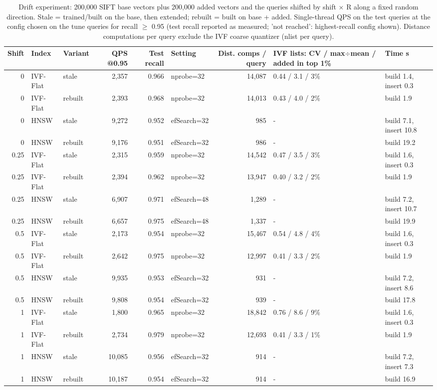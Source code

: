 \begin{table}[t]
\centering
\small
\begin{adjustbox}{max width=\linewidth}
\begin{tabular}{rllrrlrp{2.8cm}p{2.4cm}}
\toprule
Shift & Index & Variant & QPS @0.95 & Test recall & Setting & Dist. comps / query & IVF lists: CV / max$\div$mean / added in top 1\% & Time s \\
\midrule
0 & IVF-Flat & stale & 2,357 & 0.966 & nprobe=32 & 14,087 & 0.44 / 3.1 / 3\% & build 1.4, insert 0.3 \\
0 & IVF-Flat & rebuilt & 2,393 & 0.968 & nprobe=32 & 14,013 & 0.43 / 4.0 / 2\% & build 1.9 \\
0 & HNSW & stale & 9,272 & 0.952 & efSearch=32 & 985 & - & build 7.1, insert 10.8 \\
0 & HNSW & rebuilt & 9,176 & 0.951 & efSearch=32 & 986 & - & build 19.2 \\
0.25 & IVF-Flat & stale & 2,315 & 0.959 & nprobe=32 & 14,542 & 0.47 / 3.5 / 3\% & build 1.6, insert 0.3 \\
0.25 & IVF-Flat & rebuilt & 2,394 & 0.962 & nprobe=32 & 13,947 & 0.40 / 3.2 / 2\% & build 1.9 \\
0.25 & HNSW & stale & 6,907 & 0.971 & efSearch=48 & 1,289 & - & build 7.2, insert 10.7 \\
0.25 & HNSW & rebuilt & 6,657 & 0.975 & efSearch=48 & 1,337 & - & build 19.9 \\
0.5 & IVF-Flat & stale & 2,173 & 0.954 & nprobe=32 & 15,467 & 0.54 / 4.8 / 4\% & build 1.6, insert 0.3 \\
0.5 & IVF-Flat & rebuilt & 2,642 & 0.975 & nprobe=32 & 12,997 & 0.41 / 3.3 / 2\% & build 1.9 \\
0.5 & HNSW & stale & 9,935 & 0.953 & efSearch=32 & 931 & - & build 7.2, insert 8.6 \\
0.5 & HNSW & rebuilt & 9,808 & 0.954 & efSearch=32 & 939 & - & build 17.8 \\
1 & IVF-Flat & stale & 1,800 & 0.965 & nprobe=32 & 18,842 & 0.76 / 8.6 / 9\% & build 1.6, insert 0.3 \\
1 & IVF-Flat & rebuilt & 2,734 & 0.979 & nprobe=32 & 12,693 & 0.41 / 3.3 / 1\% & build 1.9 \\
1 & HNSW & stale & 10,085 & 0.956 & efSearch=32 & 914 & - & build 7.2, insert 7.3 \\
1 & HNSW & rebuilt & 10,187 & 0.954 & efSearch=32 & 914 & - & build 16.9 \\
\bottomrule
\end{tabular}
\end{adjustbox}
\caption{Drift experiment: 200,000 SIFT base vectors plus 200,000 added vectors and the queries shifted by shift $\times$ R along a fixed random direction. Stale = trained/built on the base, then extended; rebuilt = built on base + added. Single-thread QPS on the test queries at the config chosen on the tune queries for recall $\geq$ 0.95 (test recall reported as measured; 'not reached': highest-recall config shown). Distance computations per query exclude the IVF coarse quantizer (nlist per query).}
\label{tab:part4}
\end{table}
